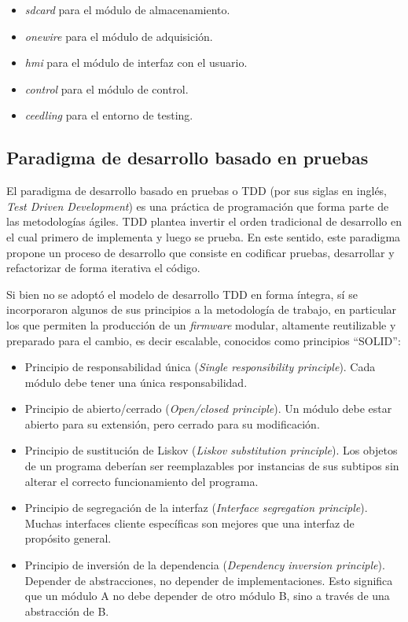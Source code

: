 \begin{itemize}
	\item \textit{sdcard} para el módulo de almacenamiento.
	\item \textit{onewire} para el módulo de adquisición.
	\item \textit{hmi} para el módulo de interfaz con el usuario.
	\item \textit{control} para el módulo de control.
	\item \textit{ceedling} para el entorno de testing.
\end{itemize}  

\subsection{Paradigma de desarrollo basado en pruebas}
\label{subsec:tdd}

El paradigma de desarrollo basado en pruebas o TDD (por sus siglas en inglés, \textit{Test Driven Development}) \citep{beck2003test} es una práctica de programación que forma parte de las metodologías ágiles.  TDD plantea invertir el orden tradicional de desarrollo en el cual primero de implementa y luego se prueba.  En este sentido, este paradigma propone un proceso de desarrollo que consiste en codificar pruebas, desarrollar y refactorizar de forma iterativa el código.

Si bien no se adoptó el modelo de desarrollo TDD en forma íntegra, sí se incorporaron algunos de sus principios a la metodología de trabajo, en particular los que permiten la producción de un \textit{firmware} modular, altamente reutilizable y preparado para el cambio, es decir escalable, conocidos como principios ``SOLID''\citep{martin2000design}:

\begin{itemize}
	\item Principio de responsabilidad única (\textit{Single responsibility principle}). Cada módulo debe tener una única responsabilidad.
	\item Principio de abierto/cerrado (\textit{Open/closed principle}). Un módulo debe estar abierto para su extensión, pero cerrado para su modificación.
	\item Principio de sustitución de Liskov (\textit{Liskov substitution principle}). Los objetos de un programa deberían ser reemplazables por instancias de sus subtipos sin alterar el correcto funcionamiento del programa.
	\item Principio de segregación de la interfaz (\textit{Interface segregation principle}). Muchas interfaces cliente específicas son mejores que una interfaz de propósito general.
	\item Principio de inversión de la dependencia (\textit{Dependency inversion principle}). Depender de abstracciones, no depender de implementaciones.  Esto significa que un módulo A no debe depender de otro módulo B, sino a través de una abstracción de B.
\end{itemize}

